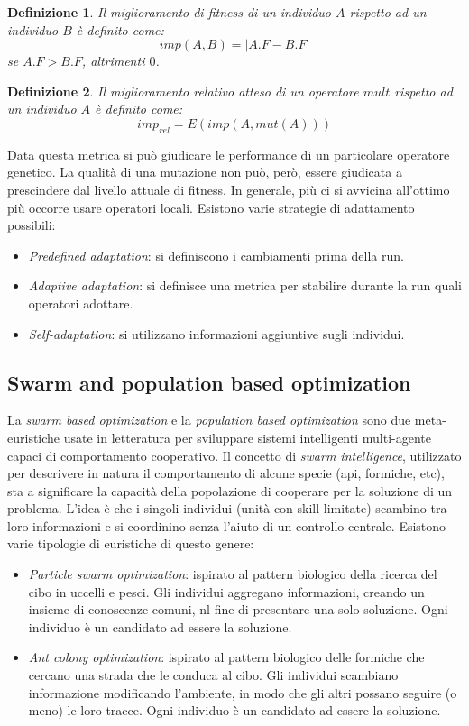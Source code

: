 \documentclass[10pt,a4paper]{article}
\newtheorem{definition}{Definizione}
\begin{document}
\begin{definition}
Il \emph{miglioramento di fitness} di un individuo $A$ rispetto ad un individuo $B$ è definito come:
$$
imp(A,B) = |A.F - B.F|
$$ 
se $A.F > B.F$, altrimenti $0$.
\end{definition}

\begin{definition}
Il \emph{miglioramento relativo atteso} di un operatore $mult$ rispetto ad un individuo $A$ è definito come:
$$
imp_{rel} = E(imp(A,mut(A)))
$$ 
\end{definition}

Data questa metrica si può giudicare le performance di un particolare operatore genetico. La qualità di una mutazione non può, però, essere giudicata a prescindere dal livello attuale di fitness. In generale, più ci si avvicina all'ottimo più occorre usare operatori locali. Esistono varie strategie di adattamento possibili:

\begin{itemize}
\item{\emph{Predefined adaptation}: si definiscono i cambiamenti prima della run.}
\item{\emph{Adaptive adaptation}: si definisce una metrica per stabilire durante la run quali operatori adottare.}
\item{\emph{Self-adaptation}: si utilizzano informazioni aggiuntive sugli individui.}
\end{itemize}

\subsection{Swarm and population based optimization}

La \emph{swarm based optimization} e la \emph{population based optimization} sono due meta-euristiche usate in letteratura per sviluppare sistemi intelligenti multi-agente capaci di  comportamento cooperativo. Il concetto di \emph{swarm intelligence}, utilizzato per descrivere in natura il comportamento di alcune specie (api, formiche, etc), sta a significare la capacità della popolazione di cooperare per la soluzione di un problema. L'idea è che i singoli individui (unità con skill limitate) scambino tra loro informazioni e si coordinino senza l'aiuto di un controllo centrale. Esistono varie tipologie di euristiche di questo genere:

\begin{itemize}
\item{\emph{Particle swarm optimization}: ispirato al pattern biologico della ricerca del cibo in uccelli e pesci. Gli individui aggregano informazioni, creando un insieme di conoscenze comuni, nl fine di presentare una solo soluzione. Ogni individuo è un candidato ad essere la soluzione.}
\item{\emph{Ant colony optimization}: ispirato al pattern biologico delle formiche che cercano una strada che le conduca al cibo. Gli individui scambiano informazione modificando l'ambiente, in modo che gli altri possano seguire (o meno) le loro tracce. Ogni individuo è un candidato ad essere la soluzione.}
\end{itemize}
\end{document}
